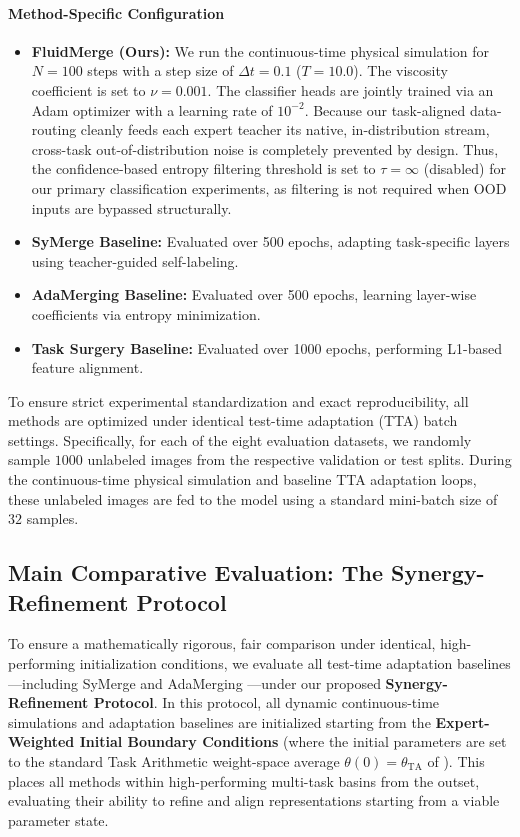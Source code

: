 \paragraph{Method-Specific Configuration}
\begin{itemize}
    \item \textbf{FluidMerge (Ours):} We run the continuous-time physical simulation for $N=100$ steps with a step size of $\Delta t = 0.1$ ($T=10.0$). The viscosity coefficient is set to $\nu = 0.001$. The classifier heads are jointly trained via an Adam optimizer with a learning rate of $10^{-2}$. Because our task-aligned data-routing cleanly feeds each expert teacher its native, in-distribution stream, cross-task out-of-distribution noise is completely prevented by design. Thus, the confidence-based entropy filtering threshold is set to $\tau = \infty$ (disabled) for our primary classification experiments, as filtering is not required when OOD inputs are bypassed structurally.
    \item \textbf{SyMerge Baseline:} Evaluated over 500 epochs, adapting task-specific layers using teacher-guided self-labeling.
    \item \textbf{AdaMerging Baseline:} Evaluated over 500 epochs, learning layer-wise coefficients via entropy minimization.
    \item \textbf{Task Surgery Baseline:} Evaluated over 1000 epochs, performing L1-based feature alignment.
\end{itemize}
To ensure strict experimental standardization and exact reproducibility, all methods are optimized under identical test-time adaptation (TTA) batch settings. Specifically, for each of the eight evaluation datasets, we randomly sample $1000$ unlabeled images from the respective validation or test splits. During the continuous-time physical simulation and baseline TTA adaptation loops, these unlabeled images are fed to the model using a standard mini-batch size of $32$ samples.

\subsection{Main Comparative Evaluation: The Synergy-Refinement Protocol}
\label{subsec:synergy_refinement}

To ensure a mathematically rigorous, fair comparison under identical, high-performing initialization conditions, we evaluate all test-time adaptation baselines—including SyMerge \cite{jung2025symerge} and AdaMerging \cite{yang2024adamerging}—under our proposed \textbf{Synergy-Refinement Protocol}. In this protocol, all dynamic continuous-time simulations and adaptation baselines are initialized starting from the \textbf{Expert-Weighted Initial Boundary Conditions} (where the initial parameters are set to the standard Task Arithmetic weight-space average $\theta(0) = \theta_{\text{TA}}$ of \citet{ilharco2023editing}). This places all methods within high-performing multi-task basins from the outset, evaluating their ability to refine and align representations starting from a viable parameter state.


